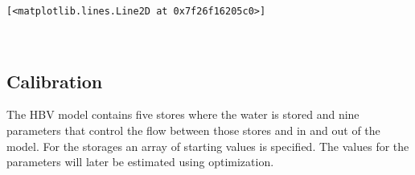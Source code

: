 \documentclass[11pt]{article}
\makeatletter
\newcommand{\boxspacing}{\kern\kvtcb@left@rule\kern\kvtcb@boxsep}
\newcommand{\prompt}[4]{
        {\ttfamily\llap{{\color{#2}[#3]:\hspace{3pt}#4}}\vspace{-\baselineskip}}
    }
\makeatother
\begin{document}
            \begin{tcolorbox}[breakable, size=fbox, boxrule=.5pt, pad at break*=1mm, opacityfill=0]
\prompt{Out}{outcolor}{6}{\boxspacing}
\begin{Verbatim}[commandchars=\\\{\}]
[<matplotlib.lines.Line2D at 0x7f26f16205c0>]
\end{Verbatim}
\end{tcolorbox}
        
    \begin{center}
    \end{center}
    { \hspace*{\fill} \\}
    
    \subsection{Calibration}\label{calibration}

    The HBV model contains five stores where the water is stored and nine
parameters that control the flow between those stores and in and out of
the model. For the storages an array of starting values is specified.
The values for the parameters will later be estimated using
optimization.
\end{document}
